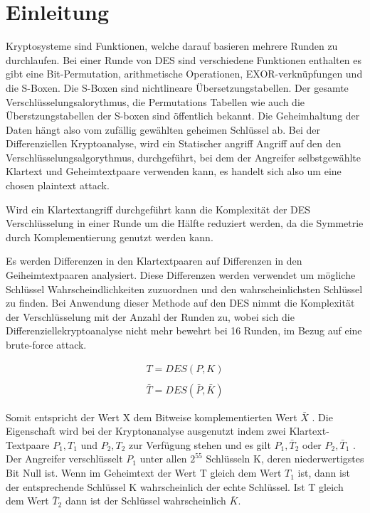 \clearpage
\section{Einleitung}\label{sec:Einleitung}
Kryptosysteme sind Funktionen, welche darauf basieren mehrere Runden zu durchlaufen. Bei einer Runde von DES sind verschiedene Funktionen enthalten es gibt eine Bit-Permutation, arithmetische Operationen, EXOR-verknüpfungen und die S-Boxen. Die S-Boxen sind nichtlineare Übersetzungstabellen. Der gesamte Verschlüsselungsalorythmus, die Permutations Tabellen wie auch die Überstzungstabellen der S-boxen sind öffentlich bekannt. Die Geheimhaltung der Daten hängt also vom zufällig gewählten geheimen Schlüssel ab. Bei der Differenziellen Kryptoanalyse, wird ein Statischer angriff Angriff auf den den Verschlüsselungsalgorythmus, durchgeführt, bei dem der Angreifer selbstgewählte Klartext und Geheimtextpaare verwenden kann, es handelt sich also um eine chosen plaintext attack.  

Wird ein Klartextangriff durchgeführt kann die Komplexität der DES Verschlüsselung in einer Runde um die Hälfte reduziert werden, da die Symmetrie durch Komplementierung genutzt werden kann.

Es werden Differenzen in den Klartextpaaren auf Differenzen in den Geiheimtextpaaren analysiert. Diese Differenzen werden verwendet um mögliche Schlüssel Wahrscheindlichkeiten zuzuordnen und den wahrscheinlichsten Schlüssel zu finden. Bei Anwendung dieser Methode auf den DES nimmt die Komplexität der Verschlüsselung mit der Anzahl der Runden zu, wobei sich die Differenziellekryptoanalyse nicht mehr bewehrt bei 16 Runden, im Bezug auf eine brute-force attack.
 
 \begin{eqnarray*}
 T=DES(P,K)\\
 \\
  \bar{T}=DES(\bar{P},\bar{K})
 \end{eqnarray*}
 
 Somit entspricht der Wert X dem Bitweise komplementierten Wert $\bar{X}$ . Die Eigenschaft wird bei der Kryptonanalyse ausgenutzt indem zwei Klartext-Textpaare $P_{1} ,T_{1}$ und $P_{2} ,T_{2}$ zur Verfügung stehen und es gilt ${P}_{1} ,\bar{T}_{2}$ oder ${P}_{2} ,\bar{T}_{1}$ . Der Angreifer verschlüsselt $P_{1}$ unter allen $2^{55}$ Schlüsseln K, deren niederwertigstes Bit Null ist. Wenn im Geheimtext der Wert T gleich dem Wert $T_{1}$ ist, dann ist der entsprechende Schlüssel K wahrscheinlich der echte Schlüssel. Ist T gleich dem Wert $\bar{T}_{2}$ dann ist der Schlüssel wahrscheinlich $\bar{K}$. 






